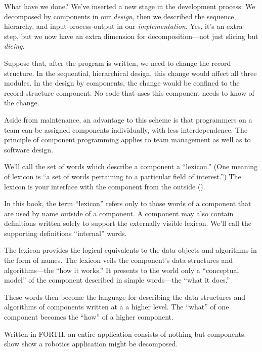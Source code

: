 What have we done? We've inserted a new stage in the development process:
We decomposed by components in our \emph{design}, then we described
the sequence, hierarchy, and input-process-output in our \emph{implementation}.
Yes, it's an extra step, but we now have an extra dimension for decomposition---not
just slicing but \emph{dicing}.

Suppose that, after the program is written, we need to change the
record structure. In the sequential, hierarchical design, this change
would affect all three modules. In the design by components, the change
would be confined to the record-structure component. No code that
uses this component needs to know of the change.

Aside from maintenance, an advantage to this scheme is that programmers
on a team can be assigned components individually, with less interdependence.
The principle of component programming applies to team management
as well as to software design.


We'll call the set of words which describe a component a {}``lexicon.''
(One meaning of lexicon is {}``a set of words pertaining to a particular
field of interest.'') The lexicon is your interface with the component
from the outside ().

In this book, the term {}``lexicon'' refers only to those words
of a component that are used by name outside of a component. A component
may also contain definitions written solely to support the externally
visible lexicon. We'll call the supporting definitions {}``internal''
words.


The lexicon provides the logical equivalents to the data objects and
algorithms in the form of names. The lexicon veils the component's
data structures and algorithms---the {}``how it works.'' It presents
to the world only a {}``conceptual model'' of the component described
in simple words---the {}``what it does.''

These words then become the language for describing the data structures
and algorithms of components written at a a higher level. The {}``what''
of one component becomes the {}``how'' of a higher component.


Written in FORTH, an entire application consists of nothing but components.
 show show a robotics application might be decomposed.

